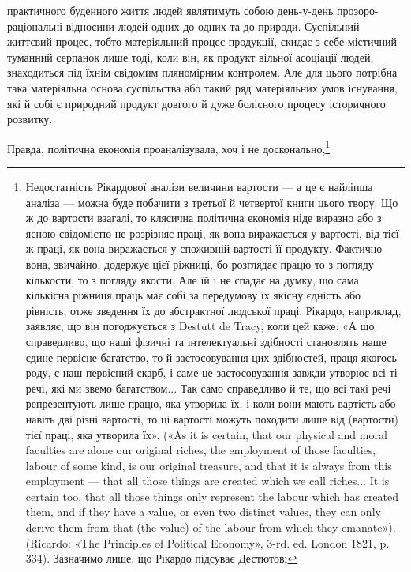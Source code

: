\parcont{}  %
практичного буденного життя людей являтимуть собою день-у-день прозоро-раціональні відносини людей
одних до одних та до природи. Суспільний життєвий процес, тобто матеріяльний процес продукції,
скидає з себе містичний туманний серпанок лише тоді, коли він, як продукт вільної асоціації людей,
знаходиться під
їхнім свідомим пляномірним контролем. Але для цього потрібна така матеріяльна основа суспільства або
такий ряд матеріяльних умов існування, які й собі є природний продукт довгого й дуже болісного
процесу історичного розвитку.

Правда, політична економія проаналізувала, хоч і не досконально,\footnote{
Недостатність Рікардової аналізи величини вартости — а це є найліпша аналіза — можна буде
побачити з третьої й четвертої книги цього твору. Що ж до вартости взагалі, то клясична політична
економія ніде виразно або з ясною свідомістю не розрізняє праці, як вона виражається у вартості, від
тієї ж праці, як вона виражається у споживній вартості її продукту. Фактично вона, звичайно,
додержує цієї ріжниці, бо розглядає працю то з погляду кількости, то з погляду якости. Але їй і не
спадає на думку, що сама кількісна ріжниця праць має собі за передумову їх якісну єдність або
рівність, отже зведення їх до абстрактної людської праці. Рікардо, наприклад, заявляє, що він
погоджується з Destutt de Tracy, коли цей каже: «А що справедливо, що наші фізичні та інтелектуальні
здібності становлять наше єдине первісне багатство, то й застосовування цих здібностей, праця
якогось роду, є наш первісний скарб, і саме це застосовування завжди утворює всі ті речі, які ми
звемо багатством... Так само справедливо й те, що всі такі речі репрезентують лише працю, яка
утворила їх, і коли вони мають вартість або навіть дві різні вартості, то ці вартості можуть
походити лише від (вартости) тієї праці, яка утворила їх». («As it is certain, that our physical and
moral faculties are alone our original riches, the employment of those faculties, labour of some
kind, is our original treasure, and that it is always from this employment — that all those things
are created which we call riches... It is certain too, that all those things only represent the
labour which has created them, and if they have a value, or even two distinct values, they can only
derive them from that (the value) of the labour from which they emanate»). (Ricardo: «The Principles
of Political Economy», 3-rd. ed. London 1821, p. 334). Зазначимо лише, що Рікардо підсуває Дестютові
}
